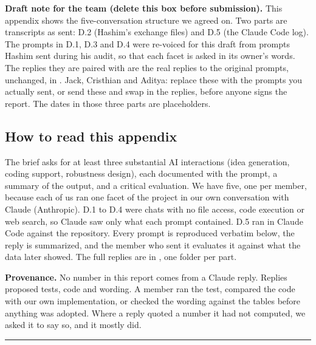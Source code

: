 
\begin{draftnote}
\textbf{Draft note for the team (delete this box before submission).} This appendix shows the five-conversation structure we agreed on. Two parts are transcripts as sent: D.2 (Hashim's exchange files) and D.5 (the Claude Code log). The prompts in D.1, D.3 and D.4 were re-voiced for this draft from prompts Hashim sent during his audit, so that each facet is asked in its owner's words. The replies they are paired with are the real replies to the original prompts, unchanged, in . Jack, Cristhian and Aditya: replace these with the prompts you actually sent, or send these and swap in the replies, before anyone signs the report. The dates in those three parts are placeholders.
\end{draftnote}

\subsection*{How to read this appendix}

The brief asks for at least three substantial AI interactions (idea generation, coding support, robustness design), each documented with the prompt, a summary of the output, and a critical evaluation. We have five, one per member, because each of us ran one facet of the project in our own conversation with Claude (Anthropic). D.1 to D.4 were chats with no file access, code execution or web search, so Claude saw only what each prompt contained. D.5 ran in Claude Code against the repository. Every prompt is reproduced verbatim below, the reply is summarized, and the member who sent it evaluates it against what the data later showed. The full replies are in , one folder per part.

\textbf{Provenance.} No number in this report comes from a Claude reply. Replies proposed tests, code and wording. A member ran the test, compared the code with our own implementation, or checked the wording against the tables before anything was adopted. Where a reply quoted a number it had not computed, we asked it to say so, and it mostly did.

\begin{center}\rule{0.5\linewidth}{0.5pt}\end{center}

